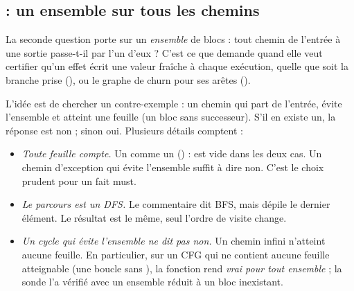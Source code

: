 \subsection{ : un ensemble sur tous les chemins}

La seconde question porte sur un \emph{ensemble} de blocs : tout chemin de
l'entrée à une sortie passe-t-il par l'un d'eux ? C'est ce que demande
 quand elle veut certifier qu'un effet écrit une valeur
fraîche à chaque exécution, quelle que soit la branche prise
(), ou le graphe de churn pour
ses arêtes  ().


L'idée est de chercher un contre-exemple : un chemin qui part de l'entrée,
évite l'ensemble et atteint une feuille (un bloc sans successeur). S'il en
existe un, la réponse est non ; sinon oui. Plusieurs détails comptent :
\begin{itemize}
  \item \emph{Toute feuille compte.} Un  comme un
     () :  est vide dans
    les deux cas. Un chemin d'exception qui évite l'ensemble suffit à dire
    non. C'est le choix prudent pour un fait must.
  \item \emph{Le parcours est un DFS.} Le commentaire dit \og BFS\fg, mais
     dépile le dernier élément. Le résultat est le même,
    seul l'ordre de visite change.
  \item \emph{Un cycle qui évite l'ensemble ne dit pas non.} Un chemin infini
    n'atteint aucune feuille. En particulier, sur un CFG qui ne contient
    aucune feuille atteignable (une boucle  sans
    ), la fonction rend \emph{vrai pour tout ensemble} ; la
    sonde l'a vérifié avec un ensemble réduit à un bloc inexistant.
\end{itemize}

